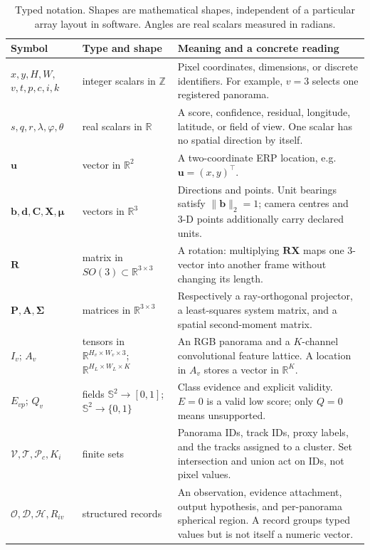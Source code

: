 \documentclass[a4paper,9pt]{extarticle}
\newcommand{\sphere}{\mathbb S^2}
\newcommand{\R}{\mathbb R}
\begin{document}
\begin{table}[t]
\centering
\caption{Typed notation. Shapes are mathematical shapes, independent of a particular array layout in software. Angles are real scalars measured in radians.}
\label{tab:types}
\begin{tabular}{@{}p{25mm}p{42mm}p{88mm}@{}}
\toprule
Symbol & Type and shape & Meaning and a concrete reading\\
\midrule
$x,y,H,W,$\newline $v,t,p,c,i,k$ & integer scalars in $\mathbb Z$ & Pixel coordinates, dimensions, or discrete identifiers. For example, $v=3$ selects one registered panorama.\\
$s,q,r,\lambda,\varphi,\theta$ & real scalars in $\R$ & A score, confidence, residual, longitude, latitude, or field of view. One scalar has no spatial direction by itself.\\
$\mathbf u$ & vector in $\R^2$ & A two-coordinate ERP location, e.g. $\mathbf u=(x,y)^\top$.\\
$\mathbf b,\mathbf d,\mathbf C,\mathbf X,\bm\mu$ & vectors in $\R^3$ & Directions and points. Unit bearings satisfy $\|\mathbf b\|_2=1$; camera centres and 3-D points additionally carry declared units.\\
$\mathbf R$ & matrix in $SO(3)\subset\R^{3\times3}$ & A rotation: multiplying $\mathbf R\mathbf X$ maps one 3-vector into another frame without changing its length.\\
$\mathbf P,\mathbf A,\bm\Sigma$ & matrices in $\R^{3\times3}$ & Respectively a ray-orthogonal projector, a least-squares system matrix, and a spatial second-moment matrix.\\
$I_v$; $A_v$ & tensors in $\R^{H_v\times W_v\times3}$; $\R^{H_L\times W_L\times K}$ & An RGB panorama and a $K$-channel convolutional feature lattice. A location in $A_v$ stores a vector in $\R^K$.\\
$E_{vp}$; $Q_v$ & fields $\sphere\to[0,1]$; $\sphere\to\{0,1\}$ & Class evidence and explicit validity. $E=0$ is a valid low score; only $Q=0$ means unsupported.\\
$\mathcal V,\mathcal T,\mathcal P_c,K_i$ & finite sets & Panorama IDs, track IDs, proxy labels, and the tracks assigned to a cluster. Set intersection and union act on IDs, not pixel values.\\
$\mathcal O,\mathcal D,\mathcal H,R_{iv}$ & structured records & An observation, evidence attachment, output hypothesis, and per-panorama spherical region. A record groups typed values but is not itself a numeric vector.\\
\bottomrule
\end{tabular}
\end{table}
\end{document}
